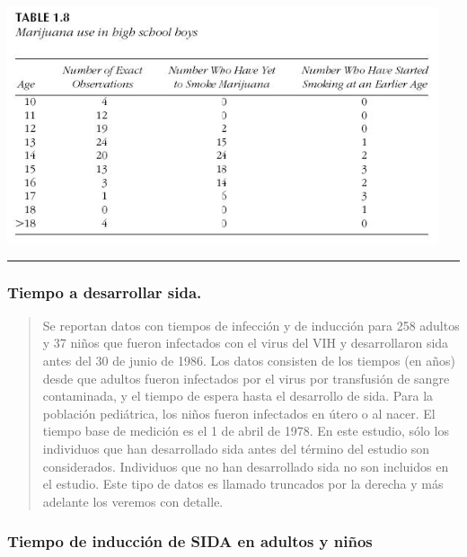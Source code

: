 \documentclass[
  letterpaper,
  DIV=11,
  numbers=noendperiod]{scrartcl}
\begin{document}
\begin{center}
\includegraphics[width=5in,height=\textheight,keepaspectratio]{figura/ejemp4.jpg}
\end{center}

\begin{center}\rule{0.5\linewidth}{0.5pt}\end{center}

\subsubsection{Tiempo a desarrollar
sida.}\label{tiempo-a-desarrollar-sida.}

\begin{quote}
Se reportan datos con tiempos de infección y de inducción para 258
adultos y 37 niños que fueron infectados con el virus del VIH y
desarrollaron sida antes del 30 de junio de 1986. Los datos consisten de
los tiempos (en años) desde que adultos fueron infectados por el virus
por transfusión de sangre contaminada, y el tiempo de espera hasta el
desarrollo de sida. Para la población pediátrica, los niños fueron
infectados en útero o al nacer. El tiempo base de medición es el 1 de
abril de 1978. En este estudio, sólo los individuos que han desarrollado
sida antes del término del estudio son considerados. Individuos que no
han desarrollado sida no son incluidos en el estudio. Este tipo de datos
es llamado truncados por la derecha y más adelante los veremos con
detalle.
\end{quote}

\subsubsection{Tiempo de inducción de SIDA en adultos y
niños}\label{tiempo-de-inducciuxf3n-de-sida-en-adultos-y-niuxf1os}
\end{document}
